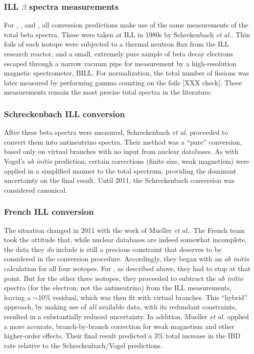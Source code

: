 \documentclass[../thesis.tex]{subfiles}
\begin{document}
\subsubsection{ILL $\beta$ spectra measurements}
\label{sec:illmeas}

For \urfive, \punine, and \puone, all conversion predictions make use of the same measurements of the total beta spectra. These were taken at ILL in 1980s by Schrekenbach \emph{et al.}. Thin foils of each isotope were subjected to a thermal neutron flux from the ILL research reactor, and a small, extremely pure sample of beta decay electrons escaped through a narrow vacuum pipe for measurement by a high-resolution magnetic spectrometer, BILL. For normalization, the total number of fissions was later measured by performing gamma counting on the foils [XXX check]. These measurements remain the most precise total spectra in the literature.

\subsubsection{Schreckenbach ILL conversion}
\label{sec:schreck}

After these beta spectra were measured, Schreckenbach \emph{et al.} proceeded to convert them into antineutrino spectra. Their method was a ``pure'' conversion, based only on virtual branches with no input from nuclear databases. As with Vogel's \ureight \emph{ab initio} prediction, certain corrections (finite size, weak magnetism) were applied in a simplified manner to the total spectrum, providing the dominant uncertainty on the final result. Until 2011, the Schreckenbach conversion was considered canonical.

\subsubsection{French ILL conversion}
\label{sec:frenchconv}

The situation changed in 2011 with the work of Mueller \emph{et al.}. The French team took the attitude that, while nuclear databases are indeed somewhat incomplete, the data they \emph{do} include is still a precious constraint that deserves to be considered in the conversion procedure. Accordingly, they began with an \emph{ab initio} calculation for all four isotopes. For \ureight, as described above, they had to stop at that point. But for the other three isotopes, they proceeded to subtract the \emph{ab initio} spectra (for the electron, not the antineutrino) from the ILL measurements, leaving a $\sim$10\% residual, which was then fit with virtual branches. This ``hybrid'' approach, by making use of \emph{all} available data, with its redundant constraints, resulted in a substantially reduced uncertainty. In addition, Mueller \emph{et al.} applied a more accurate, branch-by-branch correction for weak magnetism and other higher-order effects. Their final result predicted a 3\% total increase in the IBD rate relative to the Schreckenbach/Vogel predictions.
\end{document}
